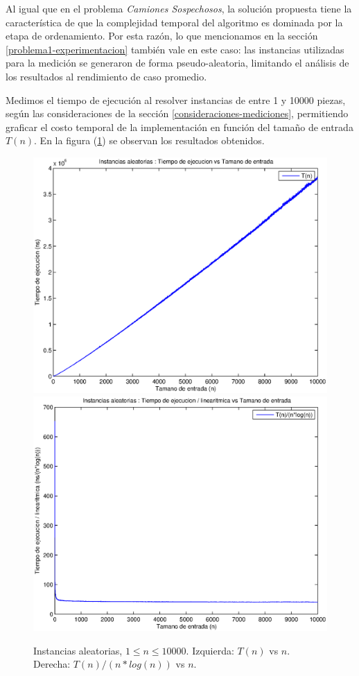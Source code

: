 

Al igual que en el problema \emph{Camiones Sospechosos}, la solución propuesta tiene la característica de que la complejidad temporal del algoritmo es dominada por la etapa de ordenamiento. Por esta razón, lo que mencionamos en la sección \ref{problema1-experimentacion} también vale en este caso: las instancias utilizadas para la medición se generaron de forma pseudo-aleatoria, limitando el análisis de los resultados al rendimiento de caso promedio.

Medimos el tiempo de ejecución al resolver instancias de entre 1 y 10000 piezas, según las consideraciones de la sección \ref{consideraciones-mediciones}, permitiendo graficar el costo temporal de la implementación en función del tamaño de entrada $T(n)$. En la figura (\ref{fig:problema2-aleatoria-10000}) se observan los resultados obtenidos.

\begin{center}
  \begin{figure}[H]
    \includegraphics[width=0.5\linewidth]{problema2/graficos/problema2_aleatoria_10000.eps}
    \includegraphics[width=0.5\linewidth]{problema2/graficos/problema2_aleatoria_10000_div_nlogn.eps}
    \caption{Instancias aleatorias, $1 \leq n \leq 10000$. Izquierda: $T(n)$ vs $n$. Derecha: $T(n) / (n * log(n))$ vs $n$.}
    \label{fig:problema2-aleatoria-10000}
  \end{figure}
\end{center}

